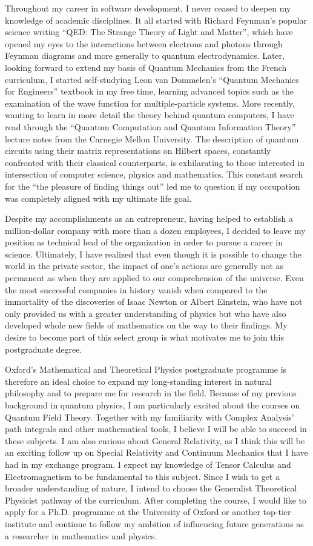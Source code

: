 \documentclass[10pt]{article}
\begin{document}
Throughout my career in software development, I never ceased to deepen my knowledge of academic disciplines. It all started with Richard Feynman's popular science writing ``QED: The Strange Theory of Light and Matter'', which have opened my eyes to the interactions between electrons and photons through Feynman diagrams and more generally to quantum electrodynamics. Later, looking forward to extend my basis of Quantum Mechanics from the French curriculum, I started self-studying Leon van Dommelen's ``Quantum Mechanics for Engineers'' textbook in my free time, learning advanced topics such as the examination of the wave function for multiple-particle systems. More recently, wanting to learn in more detail the theory behind quantum computers, I have read through the ``Quantum Computation and Quantum Information Theory'' lecture notes from the Carnegie Mellon University. The description of quantum circuits using their matrix representations on Hilbert spaces, constantly confronted with their classical counterparts, is exhilarating to those interested in intersection of computer science, physics and mathematics. This constant search for the ``the pleasure of finding things out'' led me to question if my occupation was completely aligned with my ultimate life goal.

Despite my accomplishments as an entrepreneur, having helped to establish a million-dollar company with more than a dozen employees, I decided to leave my position as technical lead of the organization in order to pursue a career in science. Ultimately, I have realized that even though it is possible to change the world in the private sector, the impact of one's actions are generally not as permanent as when they are applied to our comprehension of the universe. Even the most successful companies in history vanish when compared to the immortality of the discoveries of Isaac Newton or Albert Einstein, who have not only provided us with a greater understanding of physics but who have also developed whole new fields of mathematics on the way to their findings. My desire to become part of this select group is what motivates me to join this postgraduate degree.

Oxford's Mathematical and Theoretical Physics postgraduate programme is therefore an ideal choice to expand my long-standing interest in natural philosophy and to prepare me for research in the field. Because of my previous background in quantum physics, I am particularly excited about the courses on Quantum Field Theory. Together with my familiarity with Complex Analysis' path integrals and other mathematical tools, I believe I will be able to succeed in these subjects. I am also curious about General Relativity, as I think this will be an exciting follow up on Special Relativity and Continuum Mechanics that I have had in my exchange program. I expect my knowledge of Tensor Calculus and Electromagnetism to be fundamental to this subject. Since I wish to get a broader understanding of nature, I intend to choose the Generalist Theoretical Physicist pathway of the curriculum. After completing the course, I would like to apply for a Ph.D. programme at the University of Oxford or another top-tier institute and continue to follow my ambition of influencing future generations as a researcher in mathematics and physics.
\end{document}
